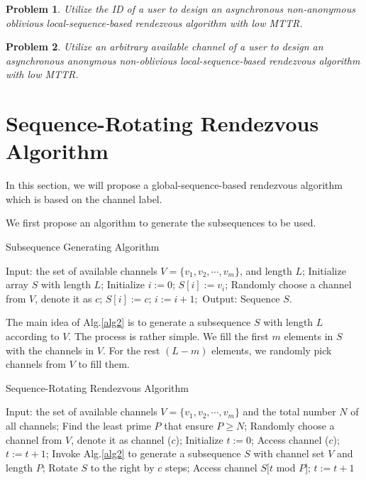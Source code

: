 \documentclass[10pt, conference, letterpaper]{IEEEtran}
\newtheorem{problem}{Problem}
\begin{document}
\begin{problem}
Utilize the ID of a user to design an asynchronous non-anonymous oblivious local-sequence-based rendezvous algorithm with low MTTR.
\end{problem}

\begin{problem}
Utilize an arbitrary available channel of a user to design an asynchronous anonymous non-oblivious local-sequence-based rendezvous algorithm with low  MTTR.
\end{problem}

\section{Sequence-Rotating Rendezvous Algorithm}

In this section, we will propose a global-sequence-based rendezvous algorithm which is based on the channel label.

We first propose an algorithm to generate the subsequences to be used.

\begin{algorithm}
\caption{Subsequence Generating Algorithm}
\label{alg2}
\begin{algorithmic}[1]
\STATE Input: the set of available channels $V=\{v_1,v_2,\cdots,v_m\}$, and length $L$;
\STATE Initialize array $S$ with length $L$;
\STATE Initialize $i :=0$;
\STATE $S[i] := v_i$;
\ELSE
\STATE Randomly choose a channel from $V$, denote it as $c$;
\STATE $S[i] := c$;
\ENDIF
\STATE $i:=i+1;$
\ENDWHILE
\STATE Output: Sequence $S$.
\end{algorithmic}
\end{algorithm}

The main idea of Alg.\ref{alg2} is to generate a subsequence $S$ with length $L$ according to $V$. The process is rather simple. We fill the first $m$ elements in $S$ with the channels in $V$. For the rest $(L-m)$ elements, we randomly pick channels from $V$ to fill them.


\begin{algorithm}
\caption{Sequence-Rotating Rendezvous Algorithm}
\label{alg1}
\begin{algorithmic}[1]
\STATE Input: the set of available channels $V=\{v_1, v_2, \cdots, v_m\}$ and the total number $N$ of all channels;
\STATE Find the least prime $P$ that ensure $P \ge N$;
\STATE Randomly choose a channel from $V$, denote it as channel ($c$);
\STATE Initialize $t := 0$;
\STATE Access channel ($c$);
\STATE $t:=t+1$;
\ENDWHILE
\STATE Invoke Alg.\ref{alg2} to generate a subsequence $S$ with channel set $V$ and length $P$;
\STATE Rotate $S$ to the right by $c$ steps;
\ENDIF
\STATE Access channel $S[t$ mod $P]$;
\STATE $t := t + 1$
\ENDWHILE

\end{algorithmic}
\end{algorithm}
\end{document}

